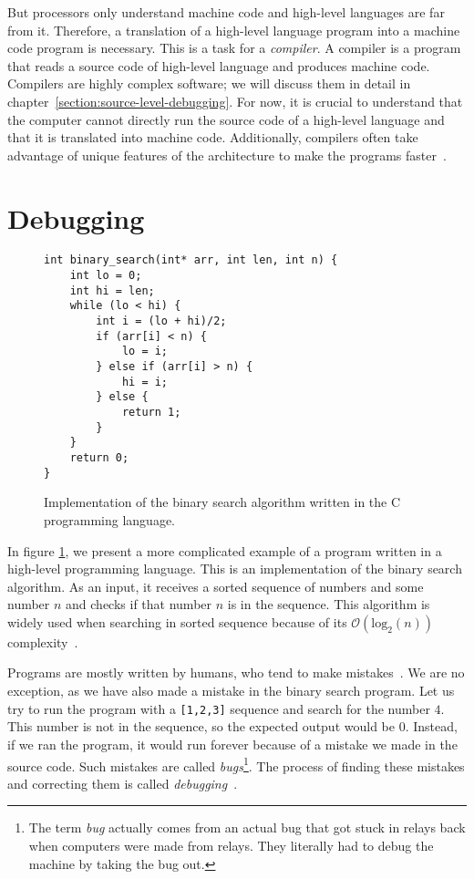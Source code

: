 But processors only understand machine code and high-level languages are far
from it. Therefore, a translation of a high-level language program into a
machine code program is necessary. This is a task for a \textit{compiler}. A
compiler is a program that reads a source code of high-level language and
produces machine code. Compilers are highly complex software; we will discuss
them in detail in chapter~\ref{section:source-level-debugging}. For now, it is
crucial to understand that the computer cannot directly run the source code of
a high-level language and that it is translated into machine code.
Additionally, compilers often take advantage of unique features of the
architecture to make the programs faster~\cite{dragon-book}.

\section{Debugging}
\begin{figure}
    \begin{verbatim}
int binary_search(int* arr, int len, int n) {
    int lo = 0;
    int hi = len;
    while (lo < hi) {
        int i = (lo + hi)/2;
        if (arr[i] < n) {
            lo = i;
        } else if (arr[i] > n) {
            hi = i;
        } else {
            return 1;
        }
    }
    return 0;
}
    \end{verbatim}
    \caption{Implementation of the binary search algorithm written in the C
    programming language.}
    \label{fig:binary-search}
\end{figure}

In figure \ref{fig:binary-search}, we present a more complicated example of a
program written in a high-level programming language. This is an implementation
of the binary search algorithm. As an input, it receives a sorted sequence of
numbers and some number $n$ and checks if that number $n$ is in the sequence.
This algorithm is widely used when searching in sorted sequence because of its
$\mathcal{O}(\text{log}_2(n))$ complexity~\cite{pruvodce}.

Programs are mostly written by humans, who tend to make
mistakes~\cite{human-error}. We are no exception, as we have also made a
mistake in the binary search program. Let us try to run the program with a
\texttt{[1,2,3]} sequence and search for the number $4$. This number is not in
the sequence, so the expected output would be $0$. Instead, if we ran the
program, it would run forever because of a mistake we made in the source code.
Such mistakes are called \textit{bugs}\footnote{The term \textit{bug} actually
comes from an actual bug that got stuck in relays back when computers were made
from relays. They literally had to debug the machine by taking the bug out.}.
The process of finding these mistakes and correcting them is called
\textit{debugging}~\cite{art-of-testing}.

